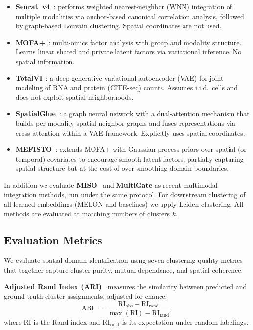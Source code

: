 \documentclass{article}
\theoremstyle{plain}
\theoremstyle{definition}
\begin{document}
\begin{itemize}
    \item \textbf{Seurat~v4}~\cite{hao2021seurat}: performs weighted nearest-neighbor (WNN) integration of multiple modalities via anchor-based canonical correlation analysis, followed by graph-based Louvain clustering. Spatial coordinates are not used.
    \item \textbf{MOFA+}~\cite{argelaguet2020mofa}: multi-omics factor analysis with group and modality structure. Learns linear shared and private latent factors via variational inference. No spatial information.
    \item \textbf{TotalVI}~\cite{gayoso2021totalvi}: a deep generative variational autoencoder (VAE) for joint modeling of RNA and protein (CITE-seq) counts. Assumes i.i.d.\ cells and does not exploit spatial neighborhoods.
    \item \textbf{SpatialGlue}~\cite{long2024spatialglue}: a graph neural network with a dual-attention mechanism that builds per-modality spatial neighbor graphs and fuses representations via cross-attention within a VAE framework. Explicitly uses spatial coordinates.
    \item \textbf{MEFISTO}~\cite{velten2022mefisto}: extends MOFA+ with Gaussian-process priors over spatial (or temporal) covariates to encourage smooth latent factors, partially capturing spatial structure but at the cost of over-smoothing domain boundaries.
\end{itemize}

In addition we evaluate \textbf{MISO}~\cite{coleman2025miso} and \textbf{MultiGate} as recent multimodal integration methods, run under the same protocol. For downstream clustering of all learned embeddings (MELON and baselines) we apply Leiden clustering. All methods are evaluated at matching numbers of clusters $k$.

\subsection{Evaluation Metrics}\label{app:metrics}

We evaluate spatial domain identification using seven clustering quality metrics that together capture cluster purity, mutual dependence, and spatial coherence.

\textbf{Adjusted Rand Index (ARI)}~\cite{hubert1985comparing} measures the similarity between predicted and ground-truth cluster assignments, adjusted for chance:
\begin{equation}
    \mathrm{ARI} \;=\; \frac{\mathrm{RI}_{\text{obs}} - \mathrm{RI}_{\text{rand}}}{\max(\mathrm{RI}) - \mathrm{RI}_{\text{rand}}},
    \label{eq:ari}
\end{equation}
where $\mathrm{RI}$ is the Rand index and $\mathrm{RI}_{\text{rand}}$ is its expectation under random labelings.
\end{document}
